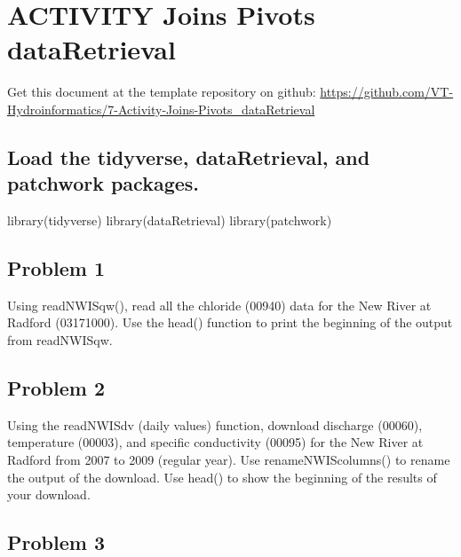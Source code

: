 \documentclass[
]{book}
\newenvironment{Shaded}{\begin{snugshade}}{\end{snugshade}}
\newcommand{\FunctionTok}[1]{\textcolor[rgb]{0.00,0.00,0.00}{#1}}
\newcommand{\NormalTok}[1]{#1}
\begin{document}
\hypertarget{joinpivotDR}{%
\chapter{ACTIVITY Joins Pivots dataRetrieval}\label{joinpivotDR}}

Get this document at the template repository on github: \url{https://github.com/VT-Hydroinformatics/7-Activity-Joins-Pivots_dataRetrieval}

\hypertarget{load-the-tidyverse-dataretrieval-and-patchwork-packages.}{%
\section{Load the tidyverse, dataRetrieval, and patchwork packages.}\label{load-the-tidyverse-dataretrieval-and-patchwork-packages.}}

\begin{Shaded}
\begin{Highlighting}[]
\FunctionTok{library}\NormalTok{(tidyverse)}
\FunctionTok{library}\NormalTok{(dataRetrieval)}
\FunctionTok{library}\NormalTok{(patchwork)}
\end{Highlighting}
\end{Shaded}

\hypertarget{problem-1-2}{%
\section{Problem 1}\label{problem-1-2}}

Using readNWISqw(), read all the chloride (00940) data for the New River at Radford (03171000). Use the head() function to print the beginning of the output from readNWISqw.

\hypertarget{problem-2-2}{%
\section{Problem 2}\label{problem-2-2}}

Using the readNWISdv (daily values) function, download discharge (00060), temperature (00003), and specific conductivity (00095) for the New River at Radford from 2007 to 2009 (regular year). Use renameNWIScolumns() to rename the output of the download. Use head() to show the beginning of the results of your download.

\hypertarget{problem-3-2}{%
\section{Problem 3}\label{problem-3-2}}
\end{document}
